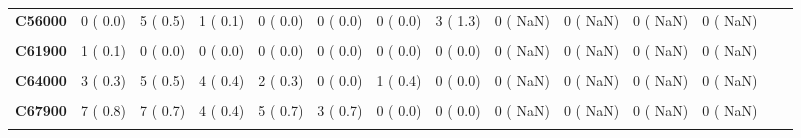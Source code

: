 \documentclass[
]{article}
\begin{document}
\begin{table}[H]
\begin{tabular}[t]{>{\raggedright\arraybackslash}p{5em}ccccccccccccc}
\textbf{C56000} & 0 (  0.0) & 5 (  0.5) & 1 (  0.1) & 0 (  0.0) & 0 (  0.0) & 0 (  0.0) & 3 (  1.3) & 0 (  NaN) & 0 (  NaN) & 0 (  NaN) & 0 (  NaN) &  & \\
\textbf{\cellcolor{gray!10}{C61000}} & \cellcolor{gray!10}{5 (  0.5)} & \cellcolor{gray!10}{5 (  0.5)} & \cellcolor{gray!10}{8 (  0.9)} & \cellcolor{gray!10}{7 (  1.0)} & \cellcolor{gray!10}{4 (  0.9)} & \cellcolor{gray!10}{2 (  0.7)} & \cellcolor{gray!10}{1 (  0.4)} & \cellcolor{gray!10}{0 (  NaN)} & \cellcolor{gray!10}{0 (  NaN)} & \cellcolor{gray!10}{0 (  NaN)} & \cellcolor{gray!10}{0 (  NaN)} & \cellcolor{gray!10}{} & \cellcolor{gray!10}{}\\
\textbf{C61900} & 1 (  0.1) & 0 (  0.0) & 0 (  0.0) & 0 (  0.0) & 0 (  0.0) & 0 (  0.0) & 0 (  0.0) & 0 (  NaN) & 0 (  NaN) & 0 (  NaN) & 0 (  NaN) &  & \\
\textbf{\cellcolor{gray!10}{C62900}} & \cellcolor{gray!10}{0 (  0.0)} & \cellcolor{gray!10}{0 (  0.0)} & \cellcolor{gray!10}{1 (  0.1)} & \cellcolor{gray!10}{0 (  0.0)} & \cellcolor{gray!10}{0 (  0.0)} & \cellcolor{gray!10}{0 (  0.0)} & \cellcolor{gray!10}{0 (  0.0)} & \cellcolor{gray!10}{0 (  NaN)} & \cellcolor{gray!10}{0 (  NaN)} & \cellcolor{gray!10}{0 (  NaN)} & \cellcolor{gray!10}{0 (  NaN)} & \cellcolor{gray!10}{} & \cellcolor{gray!10}{}\\
\textbf{C64000} & 3 (  0.3) & 5 (  0.5) & 4 (  0.4) & 2 (  0.3) & 0 (  0.0) & 1 (  0.4) & 0 (  0.0) & 0 (  NaN) & 0 (  NaN) & 0 (  NaN) & 0 (  NaN) &  & \\
\textbf{\cellcolor{gray!10}{C65000}} & \cellcolor{gray!10}{1 (  0.1)} & \cellcolor{gray!10}{0 (  0.0)} & \cellcolor{gray!10}{0 (  0.0)} & \cellcolor{gray!10}{0 (  0.0)} & \cellcolor{gray!10}{0 (  0.0)} & \cellcolor{gray!10}{0 (  0.0)} & \cellcolor{gray!10}{0 (  0.0)} & \cellcolor{gray!10}{0 (  NaN)} & \cellcolor{gray!10}{0 (  NaN)} & \cellcolor{gray!10}{0 (  NaN)} & \cellcolor{gray!10}{0 (  NaN)} & \cellcolor{gray!10}{} & \cellcolor{gray!10}{}\\
\textbf{C67900} & 7 (  0.8) & 7 (  0.7) & 4 (  0.4) & 5 (  0.7) & 3 (  0.7) & 0 (  0.0) & 0 (  0.0) & 0 (  NaN) & 0 (  NaN) & 0 (  NaN) & 0 (  NaN) &  & \\
\textbf{\cellcolor{gray!10}{C68800}} & \cellcolor{gray!10}{0 (  0.0)} & \cellcolor{gray!10}{0 (  0.0)} & \cellcolor{gray!10}{0 (  0.0)} & \cellcolor{gray!10}{1 (  0.1)} & \cellcolor{gray!10}{0 (  0.0)} & \cellcolor{gray!10}{0 (  0.0)} & \cellcolor{gray!10}{0 (  0.0)} & \cellcolor{gray!10}{0 (  NaN)} & \cellcolor{gray!10}{0 (  NaN)} & \cellcolor{gray!10}{0 (  NaN)} & \cellcolor{gray!10}{0 (  NaN)} & \cellcolor{gray!10}{} & \cellcolor{gray!10}{}\\

\end{tabular}
\end{table}
\end{document}
